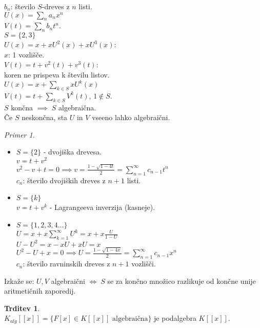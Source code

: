 \documentclass[a4paper, 12pt]{book}
\theoremstyle{definition}
\newtheorem{claim}[counter]{Trditev}
\theoremstyle{remark}
\newtheorem*{ex}{Primer}
\begin{document}
$b_n$: število $S$-dreves z $n$ listi. \\
$U(x) = \sum_n a_n x^n$ \\
$V(t) = \sum_n b_n t^n$. \\
$S = \{2,3\}$ \\
$U(x) = x + x U^2(x) + x U^3(x)$: \\
$x$: 1 vozlišče. \\
$V(t) = t + v^2(t) + v^3(t)$: \\
koren ne prispeva k številu listov. \\
$U(x) = x + \sum_{k \in S} x U^k(x)$ \\
$V(t) = t + \sum_{k \in S} V^k(t)$, $1 \notin S$. \\
$S$ končna $\implies \; S$ algebraična. \\
Če $S$ neskončna, sta $U$ in $V$ vseeno lahko algebraični. \\
\begin{ex} \text{} \\
  \begin{itemize}
    \item $S = \{2\}$ - dvojiška drevesa. \\
      $v = t + v^2$ \\
      $v^2 - v + t = 0 \implies v = \frac{1-\sqrt{1-4t}}{2} = \sum_{n=1}^{\infty} c_{n-1} t^n$ \\
      $c_n$: število dvojiških dreves z $n+1$ listi.
    \item $S = \{k\}$ \\
      $v = t + v^k$ - Lagrangeeva inverzija (kasneje).
    \item $S = \{1, 2, 3, 4 \dots\}$ \\
      $U = x + x \sum_{k=1}^{\infty} U^k = x + x \frac{U}{1-U}$ \\
      $U - U^2 = x - xU + xU = x$ \\
      $U^2 - U + x = 0 \implies U = \frac{1-\sqrt{1-4x}}{2} = \sum_{n=1}^{\infty} c_{n-1} x^n$ \\
      $c_n$: število ravninskih dreves z $n+1$ vozlišči.
  \end{itemize}
  Izkaže se: $U,V$ algebraični $\iff \; S$ se za končno množico razlikuje od končne unije aritmetičnih zaporedij.
\end{ex}
\begin{claim} \text{} \\
  $K_{alg}[[x]] = \{F[x] \in K[[x]] \text{ algebraična}\}$ je podalgebra $K[[x]]$.
\end{claim}
\end{document}
